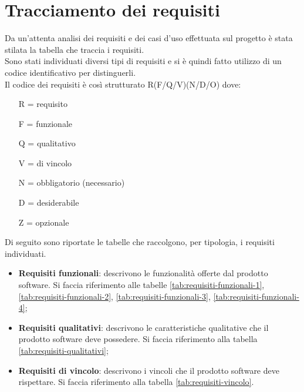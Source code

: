 \section{Tracciamento dei requisiti}

Da un'attenta analisi dei requisiti e dei casi d'uso effettuata sul progetto è stata stilata la tabella che traccia i requisiti.\\
Sono stati individuati diversi tipi di requisiti e si è quindi fatto utilizzo di un codice identificativo per distinguerli.\\
Il codice dei requisiti è così strutturato R(F/Q/V)(N/D/O) dove:
\begin{enumerate}
	\item[R =] requisito
    \item[F =] funzionale
    \item[Q =] qualitativo
    \item[V =] di vincolo
    \item[N =] obbligatorio (necessario)
    \item[D =] desiderabile
    \item[Z =] opzionale
\end{enumerate}

Di seguito sono riportate le tabelle che raccolgono, per tipologia, i requisiti individuati.\\
\begin{itemize}
    \item \textbf{Requisiti funzionali}: descrivono le funzionalità offerte dal prodotto software. Si faccia riferimento alle tabelle \ref{tab:requisiti-funzionali-1}, \ref{tab:requisiti-funzionali-2}, \ref{tab:requisiti-funzionali-3}, \ref{tab:requisiti-funzionali-4};
    \item \textbf{Requisiti qualitativi}: descrivono le caratteristiche qualitative che il prodotto software deve possedere. Si faccia riferimento alla tabella \ref{tab:requisiti-qualitativi};
    \item \textbf{Requisiti di vincolo}: descrivono i vincoli che il prodotto software deve rispettare. Si faccia riferimento alla tabella \ref{tab:requisiti-vincolo}.
\end{itemize}

\clearpage


